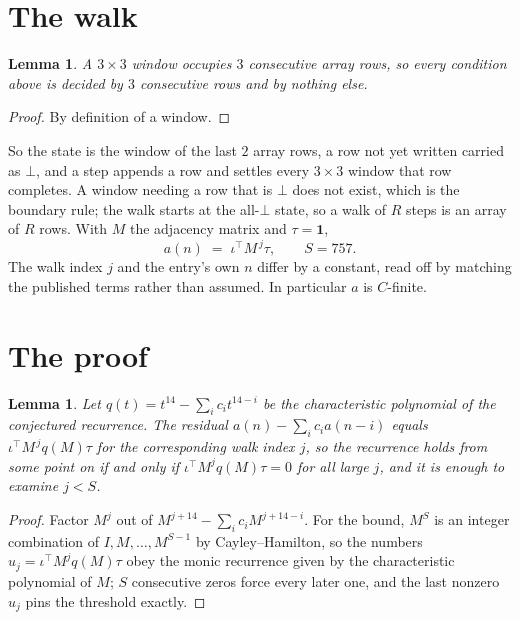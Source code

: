 \documentclass[11pt,a4paper]{article}
\theoremstyle{plain}
\newtheorem{lemma}[theorem]{Lemma}
\theoremstyle{definition}
\begin{document}
\section{The walk}

\begin{lemma}\label{lem:win}
A $3\times3$ window occupies $3$ consecutive array rows, so every condition above is
decided by $3$ consecutive rows and by nothing else.
\end{lemma}

\begin{proof}
By definition of a window.
\end{proof}

So the state is the window of the last $2$ array rows, a row not yet written carried as
$\bot$, and a step appends a row and settles every $3\times3$ window that row completes. A
window needing a row that is $\bot$ does not exist, which is the boundary rule; the walk starts
at the all-$\bot$ state, so a walk of $R$ steps is an array of $R$ rows. With $M$ the adjacency
matrix and $\tau=\mathbf{1}$,
\[
a(n)\;=\;\iota^{\!\top}M^{\,j}\tau ,\qquad S=757.
\]
The walk index $j$ and the entry's own $n$ differ by a constant, read off by matching the
published terms rather than assumed. In particular $a$ is $C$-finite.

\section{The proof}

\begin{lemma}\label{lem:crit}
Let $q(t)=t^{14}-\sum_i c_it^{14-i}$ be the characteristic polynomial of the
conjectured recurrence. The residual $a(n)-\sum_ic_ia(n-i)$ equals
$\iota^{\!\top}M^{\,j}q(M)\tau$ for the corresponding walk index $j$, so the recurrence
holds from some point on if and only if $\iota^{\!\top}M^{j}q(M)\tau=0$ for all large $j$,
and it is enough to examine $j<S$.
\end{lemma}

\begin{proof}
Factor $M^{j}$ out of $M^{j+14}-\sum_ic_iM^{j+14-i}$. For the bound, $M^{S}$
is an integer combination of $I,M,\dots,M^{S-1}$ by Cayley--Hamilton, so the numbers
$u_j=\iota^{\!\top}M^{j}q(M)\tau$ obey the monic recurrence given by the characteristic
polynomial of $M$; $S$ consecutive zeros force every later one, and the last nonzero $u_j$
pins the threshold exactly.
\end{proof}
\end{document}
